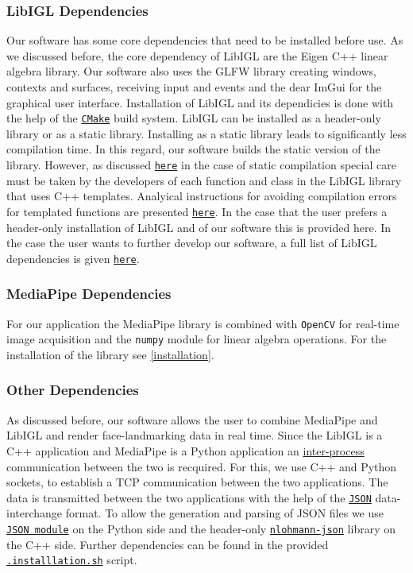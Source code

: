 \subsubsection{LibIGL Dependencies}
Our software has some core dependencies that need 
to be installed before use. As we discussed before, the core dependency of
LibIGL are the Eigen C++ linear algebra library. Our software also uses
the GLFW library creating windows, contexts and
surfaces, receiving input and events and the dear ImGui for 
the graphical user interface. Installation of LibIGL and its dependicies 
is done with the help of the \texttt{\href{https://cmake.org/}{CMake}} build
system. LibIGL can be installed as a header-only library or as a static 
library. Installing as a static library leads to significantly less 
compilation time. In this regard, our software builds the static version of 
the library. However, as discussed \texttt{\href{https://libigl.github.io/static-library/}{here}}
in the case of static compilation special care must be taken by the developers
of each function and class in the LibIGL library that uses C++ templates. 
Analyical instructions for avoiding compilation errors for templated functions
are presented \texttt{\href{https://libigl.github.io/static-library/}{here}}.
In the case that the user prefers a header-only installation of LibIGL
and of our software this is provided here. 
In the case the user wants to further develop our software, a full list of 
LibIGL dependencies is given 
\texttt{\href{https://libigl.github.io/third-party/}{here}}.

\subsubsection{MediaPipe Dependencies}
For our application the MediaPipe library is combined with \texttt{OpenCV} for 
real-time image acquisition and the \texttt{numpy} module for linear 
algebra operations. For the installation of the library see
\ref{installation}.

\subsubsection{Other Dependencies}
As discussed before, our software allows the user to combine MediaPipe and 
LibIGL and render face-landmarking data in real time. Since the LibIGL 
is a C++ application and MediaPipe is a Python application an 
\href{https://en.wikipedia.org/wiki/Inter-process_communication}{inter-process}
communication between the two is recquired. For this, we use C++ and 
Python sockets, to establish a TCP communication between the two applications.
The data is transmitted between the two applications with the help 
of the \texttt{\href{https://www.json.org/json-en.html}{JSON}} data-interchange 
format. To allow the generation and parsing of JSON files we use 
\texttt{\href{https://docs.python.org/3/library/json.html}{JSON module}} on the 
Python side and the header-only
\texttt{\href{https://github.com/nlohmann/json}{nlohmann-json}} library on the
C++ side. Further dependencies can be found in the provided
\texttt{\href{https://github.com/amartsop/SkeletalAnimationMultiThreadFace/blob/master/.installation.sh}{.installlation.sh}}
script.

